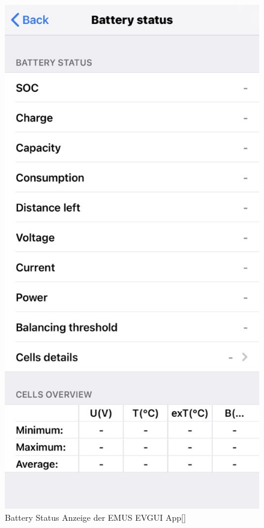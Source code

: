 \begin{figure}[H]
	\begin{center}
		\includegraphics[scale=0.4]{figures/Akku/BMSBatteryStatus.png}
		\caption{Battery Status Anzeige der EMUS EVGUI App[\cite{BatteryStatusApp}]}
		\label{fig: Battery Status Anzeige der EMUS EVGUI App}
	\end{center}
\end{figure}
\newpage

